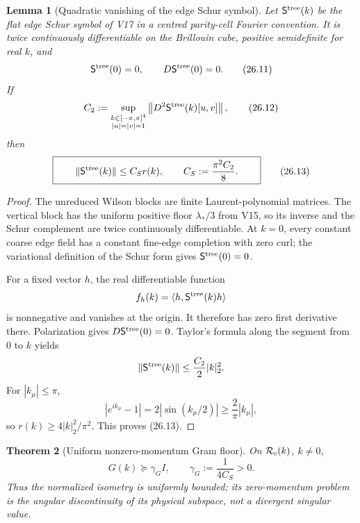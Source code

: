 \documentclass[11pt,oneside]{book}
\newtheorem{theorem}{Theorem}[chapter]
\newtheorem{lemma}[theorem]{Lemma}
\theoremstyle{definition}
\theoremstyle{remark}
\begin{document}
\begin{lemma}[Quadratic vanishing of the edge Schur symbol]
\label{lem:e8v26-Schur-quadratic}
Let \(\mathsf S^{\rm tree}(k)\) be the flat edge Schur symbol of V17
in a centred parity-cell Fourier convention.  It is twice
continuously differentiable on the Brillouin cube, positive
semidefinite for real \(k\), and
\[
                \mathsf S^{\rm tree}(0)=0,\qquad
                D\mathsf S^{\rm tree}(0)=0.                       \tag{26.11}
\]
If
\[
 C_2:=\sup_{\substack{k\in[-\pi,\pi]^4\\|u|=|v|=1}}
 \left\|D^2\mathsf S^{\rm tree}(k)[u,v]\right\|,                  \tag{26.12}
\]
then
\[
\boxed{\qquad
 \|\mathsf S^{\rm tree}(k)\|
 \leq C_S r(k),\qquad C_S:=\frac{\pi^2C_2}{8}.
\qquad}                                                           \tag{26.13}
\]
\end{lemma}

\begin{proof}
The unreduced Wilson blocks are finite Laurent-polynomial matrices.
The vertical block has the uniform positive floor
\(\lambda_*/3\) from V15, so its inverse and the Schur complement are
twice continuously differentiable.  At \(k=0\), every constant coarse
edge field has a constant fine-edge completion with zero curl; the
variational definition of the Schur form gives
\(\mathsf S^{\rm tree}(0)=0\).

For a fixed vector \(h\), the real differentiable function
\[
 f_h(k)=\langle h,\mathsf S^{\rm tree}(k)h\rangle
\]
is nonnegative and vanishes at the origin.  It therefore has zero
first derivative there.  Polarization gives
\(D\mathsf S^{\rm tree}(0)=0\).  Taylor's formula along the segment
from \(0\) to \(k\) yields
\[
 \|\mathsf S^{\rm tree}(k)\|\leq\frac{C_2}{2}|k|_2^2.
\]
For \(|k_\mu|\leq\pi\),
\[
 |e^{ik_\mu}-1|=2|\sin(k_\mu/2)|
 \geq\frac{2}{\pi}|k_\mu|,
\]
so \(r(k)\geq4|k|_2^2/\pi^2\).  This proves (26.13).
\end{proof}

\begin{theorem}[Uniform nonzero-momentum Gram floor]
\label{thm:e8v26-Gram-floor}
On \({\cal R}_c(k)\), \(k\ne0\),
\[
\boxed{\qquad
                  G(k)\succeq\gamma_G I,\qquad
                  \gamma_G:=\frac1{4C_S}>0.
\qquad}                                                           \tag{26.14}
\]
Thus the normalized isometry is uniformly bounded; its zero-momentum
problem is the angular discontinuity of its physical subspace, not a
divergent singular value.
\end{theorem}
\end{document}

